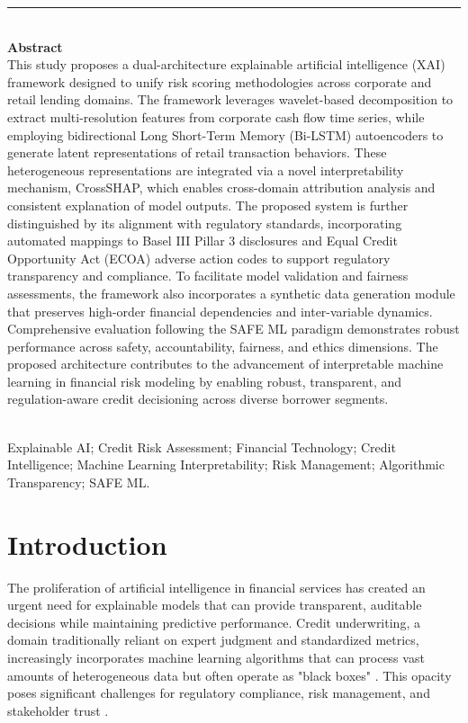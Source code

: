 \documentclass[a4paper,11pt,twoside]{article}
\newcommand{\0}{\Bf{0}}
\theoremstyle{definition}
\begin{document}
{\color{Brown}\rule{0.7\textwidth}{2pt}}\\[0.2cm]
{\color{Brown}\bf\large Abstract}\\
This study proposes a dual-architecture explainable artificial intelligence (XAI) framework designed to unify risk scoring methodologies across corporate and retail lending domains. The framework leverages wavelet-based decomposition to extract multi-resolution features from corporate cash flow time series, while employing bidirectional Long Short-Term Memory (Bi-LSTM) autoencoders to generate latent representations of retail transaction behaviors. These heterogeneous representations are integrated via a novel interpretability mechanism, CrossSHAP, which enables cross-domain attribution analysis and consistent explanation of model outputs. The proposed system is further distinguished by its alignment with regulatory standards, incorporating automated mappings to Basel III Pillar 3 disclosures and Equal Credit Opportunity Act (ECOA) adverse action codes to support regulatory transparency and compliance. To facilitate model validation and fairness assessments, the framework also incorporates a synthetic data generation module that preserves high-order financial dependencies and inter-variable dynamics. Comprehensive evaluation following the SAFE ML paradigm demonstrates robust performance across safety, accountability, fairness, and ethics dimensions. The proposed architecture contributes to the advancement of interpretable machine learning in financial risk modeling by enabling robust, transparent, and regulation-aware credit decisioning across diverse borrower segments.
\vspace{0.5cm}

\\
Explainable AI; Credit Risk Assessment; Financial Technology; Credit Intelligence; Machine Learning Interpretability; Risk Management; Algorithmic Transparency; SAFE ML.

\vspace{0.5cm}
\noindent{\color{Brown}\rule{0.7\textwidth}{2pt}}
\section{Introduction}

The proliferation of artificial intelligence in financial services has created an urgent need for explainable models that can provide transparent, auditable decisions while maintaining predictive performance. Credit underwriting, a domain traditionally reliant on expert judgment and standardized metrics, increasingly incorporates machine learning algorithms that can process vast amounts of heterogeneous data but often operate as "black boxes" \cite{ref1}. This opacity poses significant challenges for regulatory compliance, risk management, and stakeholder trust \cite{ref2}.
\end{document}
